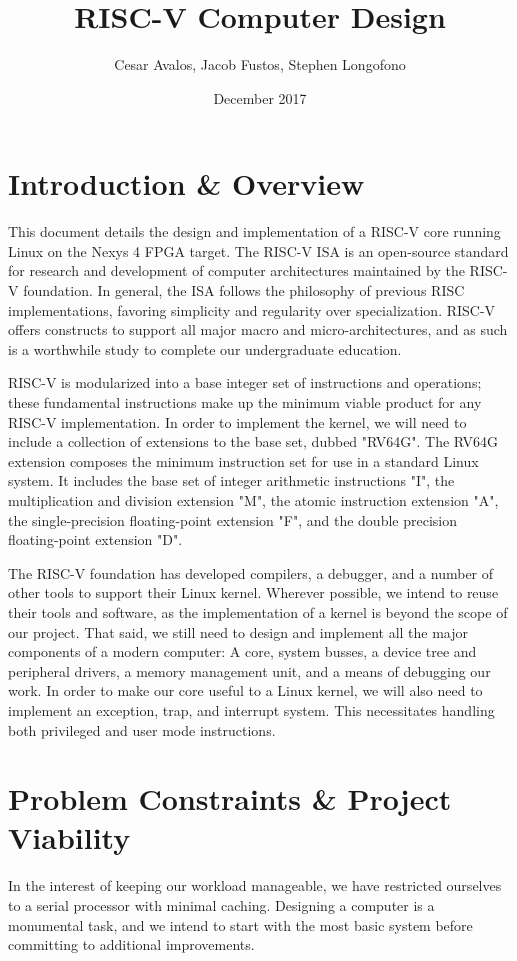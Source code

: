 \documentclass{article}
\title{RISC-V Computer Design}
\author{Cesar Avalos, Jacob Fustos, Stephen Longofono}
\date{December 2017}
\begin{document}
\maketitle

\section{Introduction  \& Overview}
This document details the design and implementation of a RISC-V core running Linux on the Nexys 4 FPGA target.  The RISC-V ISA is an open-source standard for research and development of computer architectures maintained by the RISC-V foundation.  In general, the ISA follows the philosophy of previous RISC implementations, favoring simplicity and regularity over specialization.  RISC-V offers constructs to support all major macro and micro-architectures, and as such is a worthwhile study to complete our undergraduate education.

RISC-V is modularized into a base integer set of instructions and operations; these fundamental instructions make up the minimum viable product for any RISC-V implementation\cite{RISCV_RDR}.  In order to implement the kernel, we will need to include a collection of extensions to the base set, dubbed "RV64G".  The RV64G extension composes the minimum instruction set for use in a standard Linux system.  It includes the base set of integer arithmetic instructions "I", the multiplication and division extension "M", the atomic instruction extension "A", the single-precision floating-point extension "F", and the double precision floating-point extension "D".

The RISC-V foundation has developed compilers, a debugger, and a number of other tools to support their Linux kernel\cite{RISCV_SS}.  Wherever possible, we intend to reuse their tools and software, as the implementation of a kernel is beyond the scope of our project.  That said, we still need to design and implement all the major components of a modern computer: A core, system busses, a device tree and peripheral drivers, a memory management unit, and a means of debugging our work.  In order to make our core useful to a Linux kernel, we will also need to implement an exception, trap, and interrupt system.  This necessitates handling both privileged and user mode instructions.

\section{Problem Constraints \& Project Viability}
In the interest of keeping our workload manageable, we have restricted ourselves to a serial processor with minimal caching.  Designing a computer is a monumental task, and we intend to start with the most basic system before committing to additional improvements.
\end{document}
